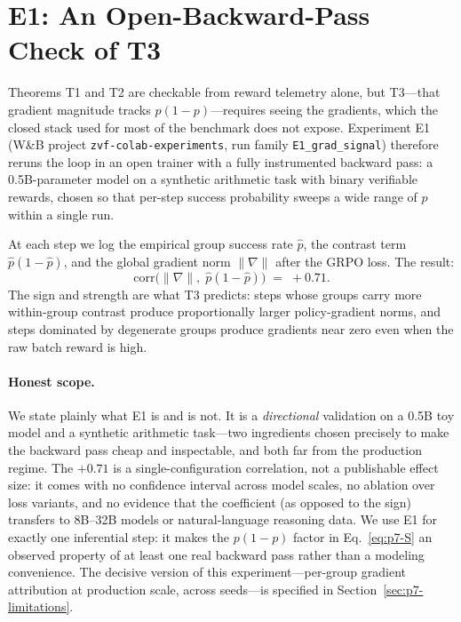 \section{E1: An Open-Backward-Pass Check of T3}
\label{sec:p7-e1}
Theorems T1 and T2 are checkable from reward telemetry alone, but T3---that
gradient magnitude tracks $p(1-p)$---requires seeing the gradients, which
the closed stack used for most of the benchmark does not expose. Experiment
E1 (W\&B project \texttt{zvf-colab-experiments}, run family
\texttt{E1\_grad\_signal}) therefore reruns the loop in an open trainer with
a fully instrumented backward pass: a 0.5B-parameter model on a synthetic
arithmetic task with binary verifiable rewards, chosen so that per-step
success probability sweeps a wide range of $p$ within a single run.

At each step we log the empirical group success rate $\hat p$, the contrast
term $\hat p(1-\hat p)$, and the global gradient norm $\|\nabla\|$ after the
GRPO loss. The result:
\begin{equation}
  \mathrm{corr}\bigl(\|\nabla\|,\; \hat p(1-\hat p)\bigr) \;=\; +0.71 .
  \label{eq:p7-e1}
\end{equation}
The sign and strength are what T3 predicts: steps whose groups carry more
within-group contrast produce proportionally larger policy-gradient norms,
and steps dominated by degenerate groups produce gradients near zero even
when the raw batch reward is high.

\paragraph{Honest scope.} We state plainly what E1 is and is not. It is a
\emph{directional} validation on a 0.5B toy model and a synthetic arithmetic
task---two ingredients chosen precisely to make the backward pass cheap and
inspectable, and both far from the production regime. The $+0.71$ is a
single-configuration correlation, not a publishable effect size: it comes
with no confidence interval across model scales, no ablation over loss
variants, and no evidence that the coefficient (as opposed to the sign)
transfers to 8B--32B models or natural-language reasoning data. We use E1
for exactly one inferential step: it makes the $p(1-p)$ factor in
Eq.~\eqref{eq:p7-S} an observed property of at least one real backward pass
rather than a modeling convenience. The decisive version of this
experiment---per-group gradient attribution at production scale, across
seeds---is specified in Section~\ref{sec:p7-limitations}.
